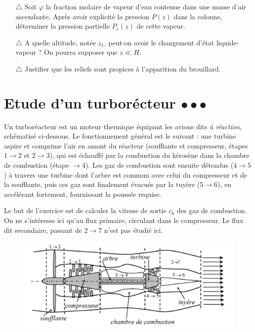 \documentclass{report}
\begin{document}
\begin{itemize}
	
	\item[$\triangle$] Soit $\varphi$ la fraction molaire de vapeur d'eau contenue dans une masse d'air ascendante. Après avoir explicité la pression $P(z)$ dans la colonne, déterminer la pression partielle $P_e(z)$ de cette vapeur. 
	
	\item[$\triangle$] A quelle altitude, notée $z_1$, peut-on avoir le changement d'état liquide-vapeur ? On pourra supposer que $z\ll H$.
	
	\item[$\triangle$] Justifier que les reliefs sont propices à l'apparition du brouillard.
	
\end{itemize}

\newpage	

\section*{Etude d'un turborécteur $\bullet\bullet\bullet$}

Un turboréacteur est un moteur thermique équipant les avions dits \textit{à réaction}, schématisé ci-dessous. Le fonctionnement général est le suivant : une turbine aspire et comprime l'air en amont du réacteur (soufflante et compresseur, étapes $1\rightarrow2$ et $2\rightarrow3$), qui est échauffé par la combustion du kérosène dans la chambre de combustion (étape $\rightarrow4$). Les gaz de combustion sont ensuite détendus ($4\rightarrow5$) à travers une turbine dont l'arbre est commun avec celui du compresseur et de la soufflante, puis ces gaz sont finalement évacués par la tuyère ($5\rightarrow6$), en accélérant fortement, fournissant la poussée requise.

Le but de l'exercice est de calculer la vitesse de sortie $c_6$ des gaz de combustion. On ne s'intéresse ici qu'au flux primaire, circulant dans le compresseur. Le flux dit secondaire, passant de $2\rightarrow7$ n'est pas étudié ici. 

\begin{figure}[!h]
\centering
	\includegraphics[width=0.65\linewidth]{turboreacteur.png}
\end{figure}
\end{document}
